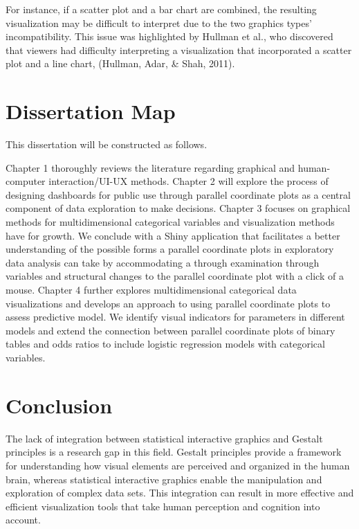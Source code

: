 \documentclass[print]{nuthesis}
\begin{document}
For instance, if a scatter plot and a bar chart are combined, the resulting visualization may be difficult to interpret due to the two graphics types' incompatibility.
This issue was highlighted by Hullman et al., who discovered that viewers had difficulty interpreting a visualization that incorporated a scatter plot and a line chart, (Hullman, Adar, \& Shah, 2011).

\hypertarget{dissertation-map}{%
\section{Dissertation Map}\label{dissertation-map}}

This dissertation will be constructed as follows.

Chapter 1 thoroughly reviews the literature regarding graphical and human-computer interaction/UI-UX methods.
Chapter 2 will explore the process of designing dashboards for public use through parallel coordinate plots as a central component of data exploration to make decisions.
Chapter 3 focuses on graphical methods for multidimensional categorical variables and visualization methods have for growth.
We conclude with a Shiny application that facilitates a better understanding of the possible forms a parallel coordinate plots in exploratory data analysis can take by accommodating a through examination through variables and structural changes to the parallel coordinate plot with a click of a mouse.
Chapter 4 further explores multidimensional categorical data visualizations and develops an approach to using parallel coordinate plots to assess predictive model.
We identify visual indicators for parameters in different models and extend the connection between parallel coordinate plots of binary tables and odds ratios to include logistic regression models with categorical variables.

\hypertarget{conclusion}{%
\section{Conclusion}\label{conclusion}}

The lack of integration between statistical interactive graphics and Gestalt principles is a research gap in this field.
Gestalt principles provide a framework for understanding how visual elements are perceived and organized in the human brain, whereas statistical interactive graphics enable the manipulation and exploration of complex data sets.
This integration can result in more effective and efficient visualization tools that take human perception and cognition into account.
\end{document}
